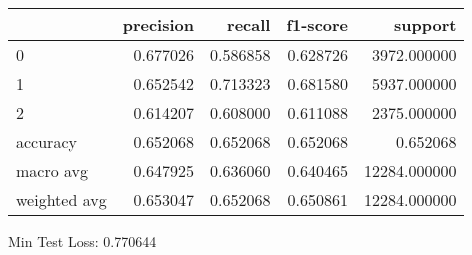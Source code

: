 \begin{tabular}{lrrrr}
\toprule
{} &  precision &    recall &  f1-score &       support \\
\midrule
0            &   0.677026 &  0.586858 &  0.628726 &   3972.000000 \\
1            &   0.652542 &  0.713323 &  0.681580 &   5937.000000 \\
2            &   0.614207 &  0.608000 &  0.611088 &   2375.000000 \\
accuracy     &   0.652068 &  0.652068 &  0.652068 &      0.652068 \\
macro avg    &   0.647925 &  0.636060 &  0.640465 &  12284.000000 \\
weighted avg &   0.653047 &  0.652068 &  0.650861 &  12284.000000 \\
\bottomrule
\end{tabular}

Min Test Loss: 0.770644